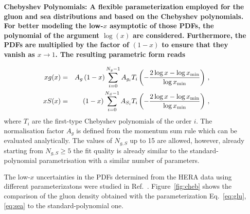 \begin{description}
\item \bf {Chebyshev Polynomials:} \rm
A flexible parameterization employed for the gluon and sea distributions
and based on the Chebyshev polynomials.
For better modeling the low-$x$ asymptotic of those PDFs, the polynomial of the argument $\log(x)$ are considered.
Furthermore, the PDFs are multiplied
by the factor of $(1-x)$ to ensure that they vanish as $x\to 1$. The resulting parametric form reads

{ \small
\begin{eqnarray}
x g(x) &=& A_g \left(1-x\right) \sum_{i=0}^{N_g-1} A_{g_i} T_i \left(-\frac{\textstyle 2\log x - \log x_{\rm min} } {\textstyle \log x_{\rm min} } \right)\,, \label{eq:glu} \\
x S(x) &=& \left(1-x\right) \sum_{i=0}^{N_S-1} A_{S_i} T_i \left(-\frac{\textstyle 2\log x - \log x_{\rm min} } {\textstyle \log x_{\rm min} } \right)\,, \label{eq:sea} 
\end{eqnarray}
}
where $T_i$ are the first-type Chebyshev polynomials of the order $i$.
The normalisation factor $A_g$ is defined from the momentum sum rule which
can be evaluated analytically.
The values of $N_{g,S}$ up to 15 are allowed, however, already starting from $N_{g,S} \ge 5$ 
the fit quality is already similar
to the standard-polynomial parametrisation with a similar number of parameters.
%

%
The low-$x$ uncertainties in the PDFs determined from the HERA data using different 
parameterizatons were studied in Ref.~\cite{Chebyshev}. Figure~\ref{fig:cheb} shows the comparison 
of the gluon density obtained with the parameterization Eq.~\ref{eq:glu},\ref{eq:sea} to 
the standard-polynomial one.


\end{description}
